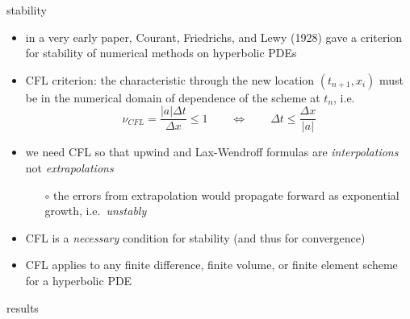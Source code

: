 \documentclass[10pt,dvipsnames,usepdftitle=false,
hyperref={pdftitle = {Finite volume methods},
    pdfauthor = {Ed Bueler}}]{beamer}
\begin{document}
\begin{frame}{stability}

\begin{itemize}
\item in a very early paper, Courant, Friedrichs, and Lewy (1928) gave a criterion for stability of numerical methods on hyperbolic PDEs
\item \alert{CFL criterion:} the characteristic through the new location $(t_{n+1},x_i)$ must be in the numerical domain of dependence of the scheme at $t_n$, i.e.
    $$\nu_{CFL} = \frac{|a|\Delta t}{\Delta x} \le 1 \qquad \iff \qquad \Delta t \le \frac{\Delta x}{|a|}$$

\item we need CFL so that upwind and Lax-Wendroff formulas are \emph{interpolations} not \emph{extrapolations}
    \begin{itemize}
    \item[$\circ$] the errors from extrapolation would propagate forward as exponential growth, i.e.~\emph{unstably}
    \end{itemize}
\item CFL is a \emph{necessary} condition for stability (and thus for convergence)
\item CFL applies to any finite difference, finite volume, or finite element scheme for a hyperbolic PDE
\end{itemize}
\end{frame}


\begin{frame}{results}

\end{frame}
\end{document}
